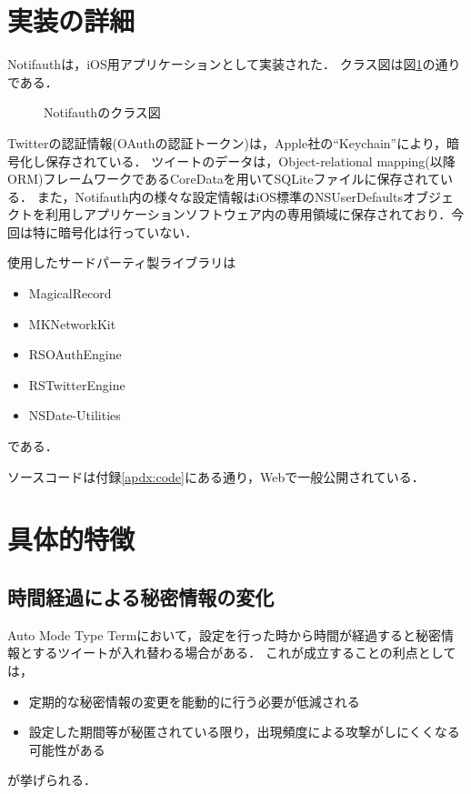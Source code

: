 \section{実装の詳細}
Notifauthは，iOS用アプリケーションとして実装された．
クラス図は図\ref{fig:notifauthClass}の通りである．

\begin{figure}[ht]
  \begin{center}
  \end{center}
  \caption{Notifauthのクラス図}
  \label{fig:notifauthClass}
\end{figure}

Twitterの認証情報(OAuthの認証トークン)は，Apple社の``Keychain''により，暗号化し保存されている．
ツイートのデータは，Object-relational mapping(以降ORM)フレームワークであるCoreDataを用いてSQLiteファイルに保存されている．
また，Notifauth内の様々な設定情報はiOS標準のNSUserDefaultsオブジェクトを利用しアプリケーションソフトウェア内の専用領域に保存されており．今回は特に暗号化は行っていない．

使用したサードパーティ製ライブラリは
\begin{itemize}
\item MagicalRecord
\item MKNetworkKit
\item RSOAuthEngine
\item RSTwitterEngine
\item NSDate-Utilities
\end{itemize}
である．

ソースコードは付録\ref{apdx:code}にある通り，Webで一般公開されている．

\section{具体的特徴}\label{sec:feature}
\subsection{時間経過による秘密情報の変化}
Auto Mode Type Termにおいて，設定を行った時から時間が経過すると秘密情報とするツイートが入れ替わる場合がある．
これが成立することの利点としては，
\begin{itemize}
  \item 定期的な秘密情報の変更を能動的に行う必要が低減される
  \item 設定した期間等が秘匿されている限り，出現頻度による攻撃がしにくくなる可能性がある
\end{itemize}
が挙げられる．

